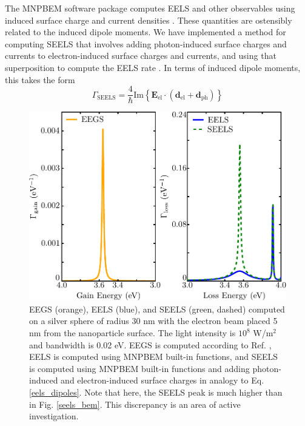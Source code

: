 \documentclass [11pt, proquest] {uwthesis}[2016/11/22]
\begin{document}
The MNPBEM software package computes EELS and other observables using induced surface charge and current densities \cite{Hohenester2012,Hohenester2014}. These quantities are ostensibly related to the induced dipole moments. We have implemented a method for computing SEELS that involves adding photon-induced surface charges and currents to electron-induced surface charges and currents, and using that superposition to compute the EELS rate \cite{vanAiken}. In terms of induced dipole moments, this takes the form
\begin{equation}
\Gamma_{\textrm{SEELS}} = \frac{4}{\hbar}\textrm{Im}\left\{ \textbf{E}_{\textrm{el}} \cdot (\textbf{d}_{\textrm{el}}+\textbf{d}_{\textrm{ph}})\right\}
\label{eels_dipoles}
\end{equation}

\begin{figure}
\begin{centering}
\includegraphics{seels_added.pdf}
\caption{EEGS (orange), EELS (blue), and SEELS (green, dashed) computed on a silver sphere of radius 30 nm with the electron beam placed 5 nm from the nanoparticle surface. The light intensity is $10^8$ W/m$^2$ and bandwidth is 0.02 eV. EEGS is computed according to Ref. \cite{EEGS}, EELS is computed using MNPBEM built-in functions, and SEELS is computed using MNPBEM built-in functions and adding photon-induced and electron-induced surface charges in analogy to Eq. \ref{eels_dipoles}. Note that here, the SEELS peak is much higher than in Fig. \ref{seels_bem}. This discrepancy is an area of active investigation.}
\label{seels_added}
\end{centering}
\end{figure}
\end{document}
